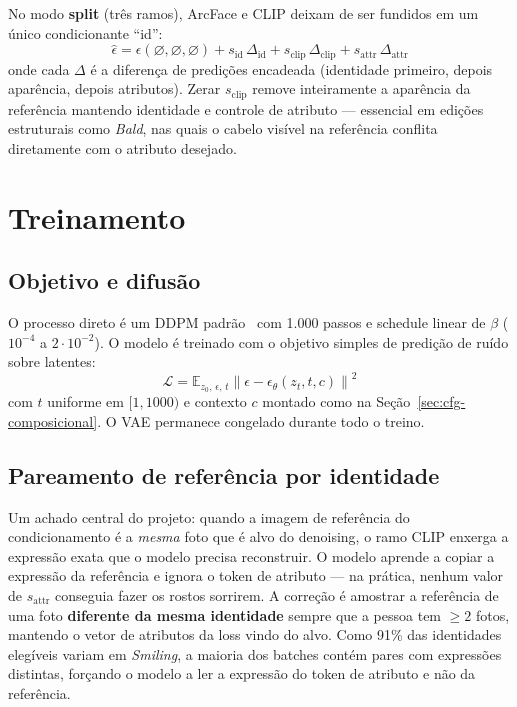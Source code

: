 \documentclass[10pt,twocolumn]{article}
\begin{document}
No modo \textbf{split} (três ramos), ArcFace e CLIP deixam de ser
fundidos em um único condicionante ``id'':
\begin{equation}
\label{eq:split}
\hat{\epsilon} = \epsilon(\varnothing,\varnothing,\varnothing)
  + s_{\mathrm{id}}\,\Delta_{\mathrm{id}}
  + s_{\mathrm{clip}}\,\Delta_{\mathrm{clip}}
  + s_{\mathrm{attr}}\,\Delta_{\mathrm{attr}}
\end{equation}
onde cada $\Delta$ é a diferença de predições encadeada (identidade
primeiro, depois aparência, depois atributos). Zerar $s_{\mathrm{clip}}$
remove inteiramente a aparência da referência mantendo identidade e
controle de atributo --- essencial em edições estruturais como
\emph{Bald}, nas quais o cabelo visível na referência conflita
diretamente com o atributo desejado.

\section{Treinamento}

\subsection{Objetivo e difusão}

O processo direto é um DDPM padrão~\cite{ho2020} com 1.000 passos e
schedule linear de $\beta$ ($10^{-4}$ a $2{\cdot}10^{-2}$). O modelo é
treinado com o objetivo simples de predição de ruído sobre latentes:
\begin{equation}
\label{eq:loss}
\mathcal{L} = \mathbb{E}_{z_0,\,\epsilon,\,t}
  \left\| \epsilon - \epsilon_\theta(z_t, t, c) \right\|^2
\end{equation}
com $t$ uniforme em $[1, 1000)$ e contexto $c$ montado como na
Seção~\ref{sec:cfg-composicional}. O VAE permanece congelado durante todo
o treino.

\subsection{Pareamento de referência por identidade}
\label{sec:pareamento}

Um achado central do projeto: quando a imagem de referência do
condicionamento é a \emph{mesma} foto que é alvo do denoising, o ramo
CLIP enxerga a expressão exata que o modelo precisa reconstruir. O modelo
aprende a copiar a expressão da referência e ignora o token de atributo
--- na prática, nenhum valor de $s_{\mathrm{attr}}$ conseguia fazer os
rostos sorrirem. A correção é amostrar a referência de uma foto
\textbf{diferente da mesma identidade} sempre que a pessoa tem ${\geq}2$
fotos, mantendo o vetor de atributos da loss vindo do alvo. Como 91\% das
identidades elegíveis variam em \emph{Smiling}, a maioria dos batches
contém pares com expressões distintas, forçando o modelo a ler a
expressão do token de atributo e não da referência.
\end{document}
